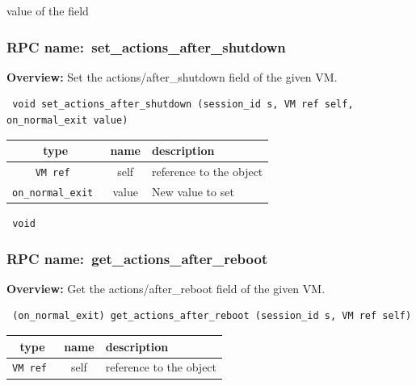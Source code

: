 value of the field
\vspace{0.3cm}
\vspace{0.3cm}
\vspace{0.3cm}
\subsubsection{RPC name:~set\_actions\_after\_shutdown}

{\bf Overview:} 
Set the actions/after\_shutdown field of the given VM.

\begin{verbatim} void set_actions_after_shutdown (session_id s, VM ref self, on_normal_exit value)\end{verbatim}



 
\vspace{0.3cm}
\begin{tabular}{|c|c|p{7cm}|}
 \hline
{\bf type} & {\bf name} & {\bf description} \\ \hline
{\tt VM ref } & self & reference to the object \\ \hline 

{\tt on\_normal\_exit } & value & New value to set \\ \hline 

\end{tabular}

\vspace{0.3cm}

{\tt 
void
}



\vspace{0.3cm}
\vspace{0.3cm}
\vspace{0.3cm}
\subsubsection{RPC name:~get\_actions\_after\_reboot}

{\bf Overview:} 
Get the actions/after\_reboot field of the given VM.

\begin{verbatim} (on_normal_exit) get_actions_after_reboot (session_id s, VM ref self)\end{verbatim}



 
\vspace{0.3cm}
\begin{tabular}{|c|c|p{7cm}|}
 \hline
{\bf type} & {\bf name} & {\bf description} \\ \hline
{\tt VM ref } & self & reference to the object \\ \hline 

\end{tabular}

